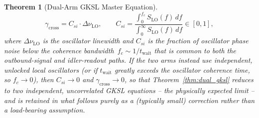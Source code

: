 \documentclass[journal]{IEEEtran}
\newtheorem{theorem}{Theorem}
\begin{document}
\begin{theorem}[Dual-Arm GKSL Master Equation]
\begin{equation}\label{eq:cross_rate}
\gamma_{\text{cross}} = C_{si}\cdot \Delta\nu_{\text{LO}}, \qquad C_{si} = \frac{\displaystyle\int_0^{f_c} S_{\text{LO}}(f)\,df}{\displaystyle\int_0^{\infty} S_{\text{LO}}(f)\,df} \in [0,1],
\end{equation}
where $\Delta\nu_{\text{LO}}$ is the oscillator linewidth and $C_{si}$ is the fraction of oscillator phase noise below the coherence bandwidth~$f_c \sim 1/t_{\text{wait}}$ that is common to both the outbound-signal and idler-readout paths. If the two arms instead use independent, unlocked local oscillators (or if $t_{\text{wait}}$ greatly exceeds the oscillator coherence time, so $f_c \to 0$), then $C_{si} \to 0$ and $\gamma_{\text{cross}} \to 0$, so that Theorem~\ref{thm:dual_gksl} reduces to two independent, uncorrelated GKSL equations -- the physically expected limit -- and is retained in what follows purely as a (typically small) correction rather than a load-bearing assumption.
\end{theorem}
\end{document}
